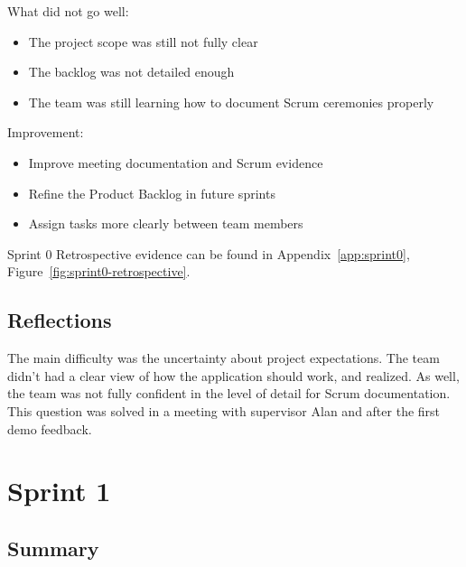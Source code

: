 What did not go well:

\begin{itemize}

 \item The project scope was still not fully clear
 
 \item The backlog was not detailed enough  
 
 \item The team was still learning how to document Scrum ceremonies properly

\end{itemize}



Improvement:

\begin{itemize}

 \item Improve meeting documentation and Scrum evidence

 \item Refine the Product Backlog in future sprints

 \item Assign tasks more clearly between team members

\end{itemize}

Sprint 0 Retrospective evidence can be found in Appendix~\ref{app:sprint0}, Figure~\ref{fig:sprint0-retrospective}.

\subsection*{Reflections}

The main difficulty was the uncertainty about project expectations. The team didn’t had a clear view of how the application should work, and realized. As well, the team was not fully confident in the level of detail for Scrum documentation. This question was solved in a meeting with supervisor Alan and after the first demo feedback.

 


\section{Sprint 1}

 

\subsection*{Summary}

